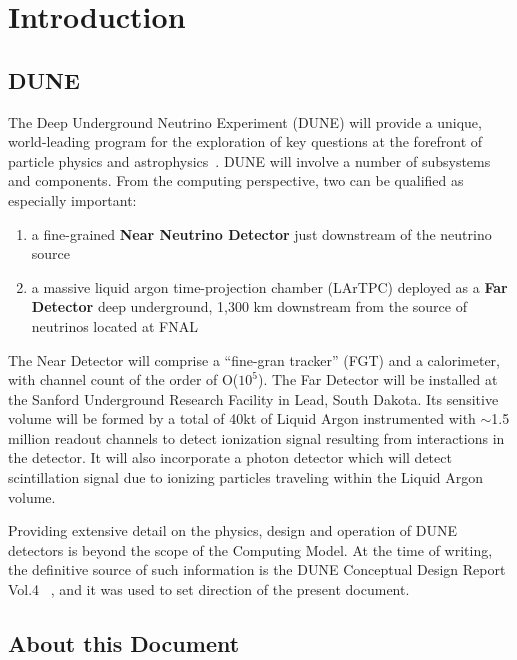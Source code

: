\section{Introduction}
\subsection{DUNE}

The Deep Underground Neutrino Experiment (DUNE) will provide a unique, world-leading program
for the exploration of key questions at the forefront of particle physics and astrophysics~\cite{sciopps}.
DUNE will involve a number of subsystems and components. From the computing perspective, two can be
qualified as especially important:

\begin{enumerate}

\item a fine-grained \textbf{Near Neutrino Detector} just downstream of the neutrino source
\item a massive liquid argon time-projection chamber (LArTPC) deployed as a \textbf{Far
Detector} deep underground, 1,300 km downstream from the source of neutrinos located at FNAL

\end{enumerate}

The Near Detector will comprise a ``fine-gran tracker'' (FGT) and a calorimeter, with channel count of the order of O($10^{5}$).
The Far Detector will be installed at the Sanford Underground Research Facility in Lead, South Dakota.
Its sensitive volume will be formed by a total of 40kt of Liquid Argon instrumented with $\sim$1.5 million readout
channels to detect ionization signal resulting from interactions in the detector. It will also incorporate a photon detector which will detect scintillation
signal due to ionizing particles traveling within the Liquid Argon volume.

Providing extensive detail on the physics, design and operation of DUNE detectors  is beyond the scope of the Computing Model.
At the time of writing, the definitive source of such information is the DUNE Conceptual Design Report Vol.4 ~\cite{cdr_vol4_docdb}, and 
it was used to set direction of the present document.


\subsection{About this Document}
\label{sec:modelrole}

